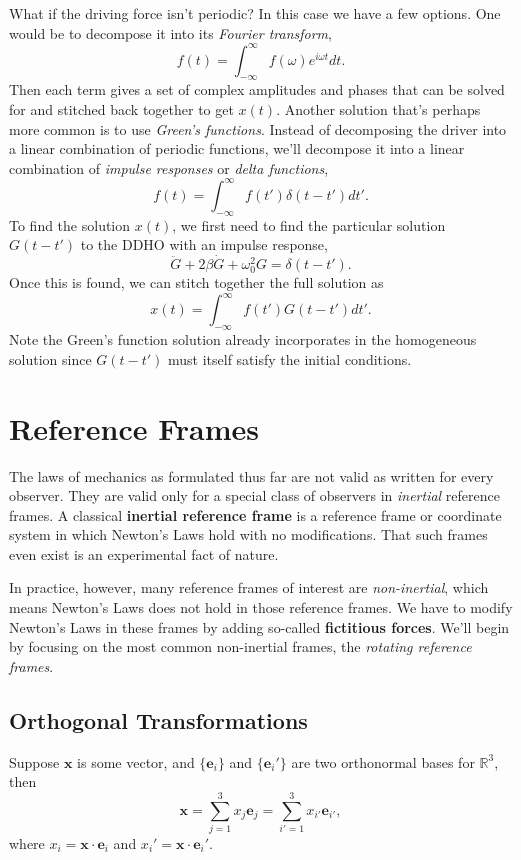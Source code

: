 \documentclass[
  letterpaper,
  DIV=11,
  numbers=noendperiod]{scrreprt}
\begin{document}
What if the driving force isn't periodic? In this case we have a few
options. One would be to decompose it into its \emph{Fourier transform},
\[
f(t) = \int_{-\infty}^{\infty} f(\omega) e^{i\omega t} dt.
\] Then each term gives a set of complex amplitudes and phases that can
be solved for and stitched back together to get \(x(t)\). Another
solution that's perhaps more common is to use \emph{Green's functions}.
Instead of decomposing the driver into a linear combination of periodic
functions, we'll decompose it into a linear combination of \emph{impulse
responses} or \emph{delta functions}, \[
f(t) = \int_{-\infty}^{\infty} f(t') \delta(t-t') dt'.
\] To find the solution \(x(t)\), we first need to find the particular
solution \(G(t-t')\) to the DDHO with an impulse response, \[
\ddot G + 2\beta\dot G + \omega_0^2 G = \delta(t - t').
\] Once this is found, we can stitch together the full solution as \[
x(t) = \int_{-\infty}^{\infty} f(t') G(t-t') dt'.
\] Note the Green's function solution already incorporates in the
homogeneous solution since \(G(t-t')\) must itself satisfy the initial
conditions.

\hypertarget{reference-frames}{%
\chapter{Reference Frames}\label{reference-frames}}

The laws of mechanics as formulated thus far are not valid as written
for every observer. They are valid only for a special class of observers
in \emph{inertial} reference frames. A classical \textbf{inertial
reference frame} is a reference frame or coordinate system in which
Newton's Laws hold with no modifications. That such frames even exist is
an experimental fact of nature.

In practice, however, many reference frames of interest are
\emph{non-inertial}, which means Newton's Laws does not hold in those
reference frames. We have to modify Newton's Laws in these frames by
adding so-called \textbf{fictitious forces}. We'll begin by focusing on
the most common non-inertial frames, the \emph{rotating reference
frames}.

\hypertarget{orthogonal-transformations}{%
\section{Orthogonal Transformations}\label{orthogonal-transformations}}

Suppose \(\mathbf{x}\) is some vector, and \(\{\mathbf{e}_i\}\) and
\(\{\mathbf{e}_i'\}\) are two orthonormal bases for \(\mathbb{R}^3\),
then \[
\mathbf{x} = \sum_{j=1}^3 x_j \mathbf{e}_j = \sum_{i'=1}^3 x_{i'} \mathbf{e}_{i'},
\] where \(x_i = \mathbf{x} \cdot \mathbf{e}_i\) and
\(x_i' = \mathbf{x} \cdot \mathbf{e}_i'\).
\end{document}
